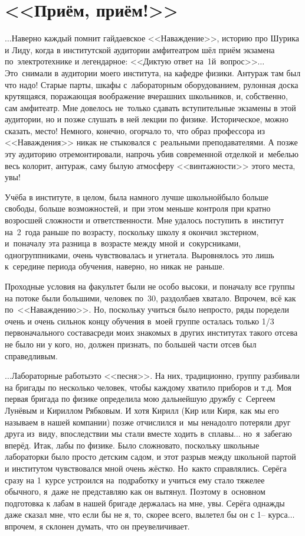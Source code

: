 \newpage
\section*{<<Приём, приём!>>}

$\ldots$Наверно каждый помнит гайдаевское <<Наваждение>>, историю про Шурика и Лиду, когда в институтской аудитории амфитеатром шёл приём экзамена по~электротехнике и легендарное: <<Диктую ответ на~1\sdash й~вопрос>>$\ldots$ Это~снимали в аудитории моего института, на кафедре физики. Антураж там был что надо! Старые парты, шкафы с~лабораторным оборудованием, рулонная доска крутящаяся, поражающая воображение вчерашних школьников, и, собственно, сам амфитеатр. Мне довелось не~только сдавать вступительные экзамены в этой аудитории, но и позже слушать в ней лекции по физике. Историческое, можно сказать, место! Немного, конечно, огорчало то, что образ профессора из <<Наваждения>> никак не стыковался с~реальными преподавателями. А позже эту аудиторию отремонтировали, напрочь убив современной отделкой и~мебелью весь колорит, антураж, саму былую атмосферу <<винтажности>> этого места, увы!

Учёба в институте, в целом, была намного лучше школьной\mdash было больше свободы, больше возможностей, и~при этом меньше контроля при кратно возросшей сложности и ответственности. Мне удалось поступить в~институт на~2~года раньше по возрасту, поскольку школу я окончил экстерном, и~поначалу эта разница в~возрасте между мной и~сокурсниками, одногруппниками, очень чувствовалась и угнетала. Выровнялось это лишь к~середине периода обучения, наверно, но никак не~раньше.

Проходные условия на факультет были не особо высоки, и поначалу все группы на потоке были большими, человек по~30, раздолбаев хватало. Впрочем, всё как по~<<Наваждению>>. Но, поскольку учиться было непросто, ряды поредели очень и очень сильно\mdash к концу обучения в~моей группе осталась только 1/3 первоначального состава\mdash среди моих знакомых в других институтах такого отсева не было ни у кого, но, должен признать, по большей части отсев был справедливым.

$\ldots$Лабораторные работы\mdash это <<песня>>. На них, традиционно, группу разбивали на бригады по несколько человек, чтобы каждому хватило приборов и т.д. Моя первая бригада по физике определила мою дальнейшую дружбу с~Сергеем Лунёвым и Кириллом Рябковым. И хотя Кирилл (Кир или Киря, как мы его называем в нашей компании) позже отчислился и~мы ненадолго потеряли друг друга из~виду, впоследствии мы стали вместе ходить в~сплавы$\ldots$ но~я~забегаю вперёд. Итак, лабы по физике. Было сложновато, поскольку школьные лабораторки было просто детским садом, и этот разрыв между школьной партой и институтом чувствовался мной очень жёстко. Но~как\sdash то справлялись. Серёга сразу на 1~курсе устроился на~подработку и учиться ему стало тяжелее обычного, я~даже не представляю как он вытянул. Поэтому в~основном подготовка к лабам в нашей бригаде держалась на мне, увы. Серёга однажды даже сказал мне, что если бы не я, то, скорее всего, вылетел бы он с 1\thinspace\nobreakdash-- курса$\ldots$ впрочем, я склонен думать, что он преувеличивает. 

